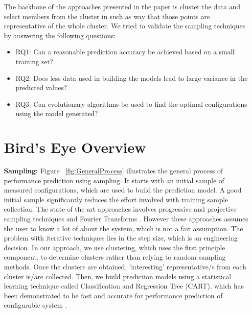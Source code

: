 \documentclass{sig-alternative}
\newcommand{\bi}{\begin{itemize}[leftmargin=0.4cm]}
\newcommand{\ei}{\end{itemize}}
\begin{document}
The backbone of the approaches presented in the paper is cluster the data and select members from the cluster in such as way that those points are representative of the whole cluster. We tried to validate the sampling techniques by answering the following questions:
        \bi
            \item{RQ1: Can a reasonable prediction accuracy be achieved based on a small training set?}
            \item{RQ2: Does less data used in building the models lead to large variance in the predicted values?}
            \item{RQ3: Can evolutionary algorithms be used to find the optimal configurations using the model generated?}
        \ei
 
\section{Bird's Eye Overview}


    \textbf{Sampling: } Figure ~\ref{fig:GeneralProcess} illustrates the general process of performance prediction using sampling. It starts with an initial sample of measured configurations, which are used to build the prediction model. A good initial sample significantly reduces the effort involved with training sample collection. The state of the art approaches involves progressive and projective sampling techniques \cite{sarkar2015cost} and Fourier Transforms \cite{zhang2015performance}. However these approaches assumes the user to know a lot of about the system, which is not a fair assumption. The problem with iterative techniques lies in the step size, which is an engineering decision. In our approach, we use clustering, which uses the first principle component, to determine clusters rather than relying to random sampling methods. Once the clusters are obtained, 'interesting' representative/s from each cluster  is/are collected. Then, we build prediction models using a statistical learning technique called Classification and Regression Tree (CART), which has been demonstrated to be fast and accurate for performance prediction of configurable system \cite{guo2013variability}.
    
\end{document}
